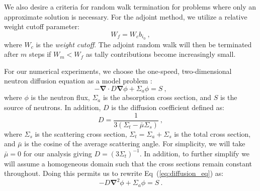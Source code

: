 \documentclass{mc2013}
\begin{document}
We also desire a criteria for random walk termination for problems
where only an approximate solution is necessary. For the adjoint
method, we utilize a relative weight cutoff parameter:
\begin{equation}
  W_f = W_c b_{i_0}\:,
  \label{eq:relative_weight_cutoff}
\end{equation}
where $W_c$ is the \textit{weight cutoff}. The adjoint random
walk will then be terminated after $m$ steps if $W_m < W_f$ as tally
contributions become increasingly small.

\label{sec:model_problem}

For our numerical experiments, we choose the one-speed,
two-dimensional neutron diffusion equation as a model problem
\cite{duderstadt_nuclear_1976}:
\begin{equation}
  -\boldsymbol{\nabla} \cdot D \boldsymbol{\nabla} \phi + \Sigma_a
  \phi = S\:,
  \label{eq:diffusion_eq}
\end{equation}
where $\phi$ is the neutron flux, $\Sigma_a$ is the absorption cross
section, and $S$ is the source of neutrons. In addition, $D$ is the
diffusion coefficient defined as:
\begin{equation}
  D = \frac{1}{3 ( \Sigma_t - \bar{\mu}\Sigma_s )}\:,
  \label{eq:diffusion_coeff}
\end{equation}
where $\Sigma_s$ is the scattering cross section, $\Sigma_t = \Sigma_a
+ \Sigma_s$ is the total cross section, and $\bar{\mu}$ is the cosine
of the average scattering angle. For simplicity, we will take
$\bar{\mu} = 0$ for our analysis giving $D=(3 \Sigma_t)^{-1}$. In
addition, to further simplify we will assume a homogeneous domain such
that the cross sections remain constant throughout. Doing this permits
us to rewrite Eq~(\ref{eq:diffusion_eq}) as:
\begin{equation}
  -D \boldsymbol{\nabla}^2 \phi + \Sigma_a \phi = S\:.
  \label{eq:diffusion_eq_simple}
\end{equation}
\end{document}
